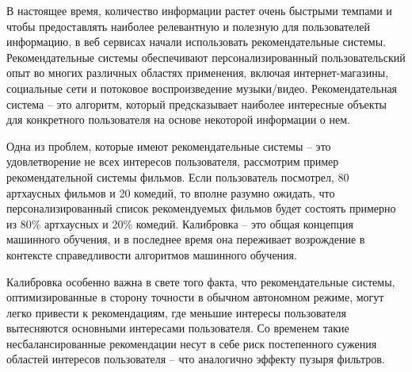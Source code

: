 

В настоящее время, количество информации растет очень быстрыми 
темпами и чтобы предоставлять наиболее релевантную и полезную 
для пользователей информацию, 
в веб сервисах начали использовать рекомендательные системы.  
Рекомендательные системы обеспечивают персонализированный 
пользовательский опыт во многих различных областях применения, 
включая интернет-магазины, социальные сети и потоковое
воспроизведение музыки/видео.  
Рекомендательная система -- это алгоритм, который предсказывает
 наиболее интересные
 объекты для конкретного пользователя на основе некоторой 
 информации о нем.

 Одна из проблем, которые имеют рекомендательные системы -- это 
 удовлетворение не всех интересов пользователя, рассмотрим пример 
 рекомендательной системы фильмов.
 Если пользователь посмотрел, 80 артхаусных фильмов и 20 
 комедий, то вполне разумно ожидать, что персонализированный 
 список рекомендуемых фильмов будет состоять примерно из 80\% 
 артхаусных и 20\% комедий.  Калибровка -- это общая концепция машинного обучения, 
 и в последнее время она переживает возрождение в 
 контексте справедливости алгоритмов машинного обучения.
  
  
  Калибровка особенно важна в свете того факта,
   что рекомендательные системы, оптимизированные в сторону
    точности
  в обычном автономном режиме, могут легко привести к 
  рекомендациям, где меньшие интересы пользователя 
  вытесняются основными интересами пользователя.
 Со временем такие несбалансированные рекомендации несут 
 в себе риск постепенного сужения областей интересов 
 пользователя -- что аналогично эффекту пузыря фильтров.
